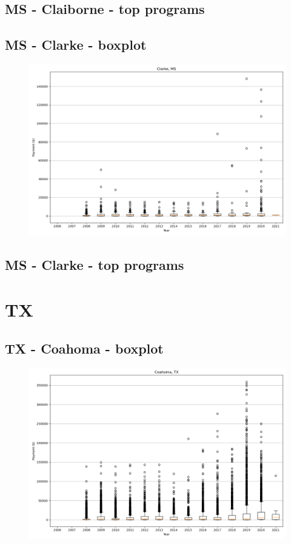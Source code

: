 \subsection*{MS - Claiborne - top programs}

\newpage
\subsection*{MS - Clarke - boxplot}
\begin{figure}[h]
\centering
\includegraphics[width=7in]{../output/boxplots/counties/Clarke-MS_boxplot.png}
\end{figure}


\subsection*{MS - Clarke - top programs}

\newpage
\section*{TX}
\subsection*{TX - Coahoma - boxplot}
\begin{figure}[h]
\centering
\includegraphics[width=7in]{../output/boxplots/counties/Coahoma-TX_boxplot.png}
\end{figure}


